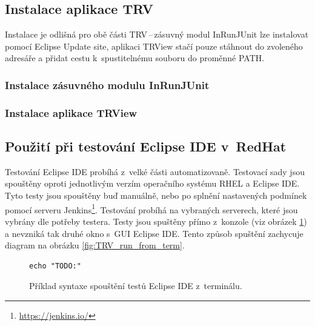       \subsection{Instalace aplikace TRV}
      Instalace je odlišná pro obě části TRV\,--\,zásuvný modul InRunJUnit lze instalovat pomocí Eclipse Update site, aplikaci TRView stačí pouze stáhnout do zvoleného adresáře a přidat cestu k~spustitelnému souboru do proměnné PATH.
      
      \subsubsection{Instalace zásuvného modulu InRunJUnit}
      
      \subsubsection{Instalace aplikace TRView}

    \subsection{Použití při testování Eclipse IDE v~RedHat}
    Testování Eclipse IDE probíhá z~velké části automatizovaně. Testovací sady jsou spouštěny oproti jednotlivým verzím operačního systému RHEL a Eclipse IDE. Tyto testy jsou spouštěny buď manuálně, nebo po splnění nastavených podmínek pomocí serveru Jenkins\footnote{\url{https://jenkins.io/}}. Testování probíhá na vybraných serverech, které jsou vybrány dle potřeby testera. Testy jsou spuštěny přímo z~konzole (viz obrázek \ref{code:run_tests_from_term}) a nevzniká tak druhé okno s~GUI Eclipse IDE. Tento způsob spuštění zachycuje diagram na obrázku \ref{fig:TRV_run_from_term}. 
    
    \lstset{language=bash}
    \begin{figure}
      \begin{lstlisting}[frame=single]
echo "TODO:"
      \end{lstlisting}
      \caption{Příklad syntaxe spouštění testů Eclipse IDE z~terminálu.}
      \label{code:run_tests_from_term}
    \end{figure}
    
